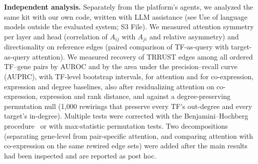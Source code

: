 \documentclass[10pt,letterpaper]{article}
\begin{document}
\textbf{Independent analysis.} Separately from the platform's agents, we analyzed the same kit with our own code, written with LLM assistance (see Use of language models outside the evaluated system; S3 File). We measured attention symmetry per layer and head (correlation of $A_{ij}$ with $A_{ji}$ and relative asymmetry) and directionality on reference edges (paired comparison of TF-as-query with target-as-query attention). We measured recovery of TRRUST edges among all ordered TF--gene pairs by AUROC and by the area under the precision--recall curve (AUPRC), with TF-level bootstrap intervals, for attention and for co-expression, expression and degree baselines, also after residualizing attention on co-expression, expression and rank distance, and against a degree-preserving permutation null (1,000 rewirings that preserve every TF's out-degree and every target's in-degree). Multiple tests were corrected with the Benjamini--Hochberg procedure~\cite{benjamini1995fdr} or with max-statistic permutation tests. Two decompositions (separating gene-level from pair-specific attention, and comparing attention with co-expression on the same rewired edge sets) were added after the main results had been inspected and are reported as post hoc.
\end{document}
